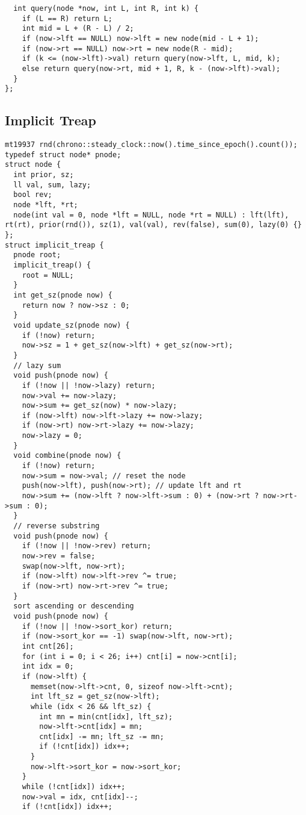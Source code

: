 \documentclass[FSZ,a4paper,onesided]{article}
\begin{document}
\begin{multicols*}{\COLS}
\begin{lstlisting}
  int query(node *now, int L, int R, int k) {
    if (L == R) return L;
    int mid = L + (R - L) / 2;
    if (now->lft == NULL) now->lft = new node(mid - L + 1);
    if (now->rt == NULL) now->rt = new node(R - mid);
    if (k <= (now->lft)->val) return query(now->lft, L, mid, k);
    else return query(now->rt, mid + 1, R, k - (now->lft)->val);
  }
};
\end{lstlisting}
\subsection{Implicit Treap}
\begin{lstlisting}
mt19937 rnd(chrono::steady_clock::now().time_since_epoch().count());
typedef struct node* pnode;
struct node {
  int prior, sz;
  ll val, sum, lazy;
  bool rev;
  node *lft, *rt;
  node(int val = 0, node *lft = NULL, node *rt = NULL) : lft(lft), rt(rt), prior(rnd()), sz(1), val(val), rev(false), sum(0), lazy(0) {}
};
struct implicit_treap {
  pnode root;
  implicit_treap() {
    root = NULL;
  }
  int get_sz(pnode now) {
    return now ? now->sz : 0;
  }
  void update_sz(pnode now) {
    if (!now) return;
    now->sz = 1 + get_sz(now->lft) + get_sz(now->rt);
  }
  // lazy sum
  void push(pnode now) {
    if (!now || !now->lazy) return;
    now->val += now->lazy;
    now->sum += get_sz(now) * now->lazy;
    if (now->lft) now->lft->lazy += now->lazy;
    if (now->rt) now->rt->lazy += now->lazy;
    now->lazy = 0;
  }
  void combine(pnode now) {
    if (!now) return;
    now->sum = now->val; // reset the node
    push(now->lft), push(now->rt); // update lft and rt
    now->sum += (now->lft ? now->lft->sum : 0) + (now->rt ? now->rt->sum : 0);
  }
  // reverse substring
  void push(pnode now) {
    if (!now || !now->rev) return;
    now->rev = false;
    swap(now->lft, now->rt);
    if (now->lft) now->lft->rev ^= true;
    if (now->rt) now->rt->rev ^= true;
  }
  sort ascending or descending
  void push(pnode now) {
    if (!now || !now->sort_kor) return;
    if (now->sort_kor == -1) swap(now->lft, now->rt);
    int cnt[26];
    for (int i = 0; i < 26; i++) cnt[i] = now->cnt[i];
    int idx = 0;
    if (now->lft) {
      memset(now->lft->cnt, 0, sizeof now->lft->cnt);
      int lft_sz = get_sz(now->lft);
      while (idx < 26 && lft_sz) {
        int mn = min(cnt[idx], lft_sz);
        now->lft->cnt[idx] = mn;
        cnt[idx] -= mn; lft_sz -= mn;
        if (!cnt[idx]) idx++;
      }
      now->lft->sort_kor = now->sort_kor;
    }
    while (!cnt[idx]) idx++;
    now->val = idx, cnt[idx]--;
    if (!cnt[idx]) idx++;

\end{lstlisting}
\end{multicols*}
\end{document}
